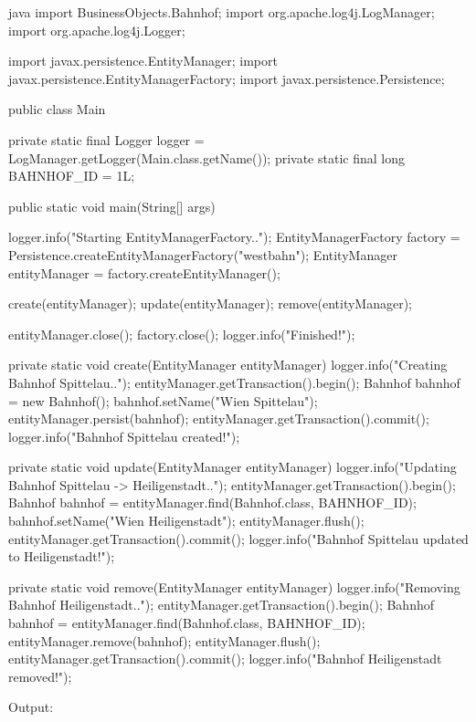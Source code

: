 \begin{code}{java}
import BusinessObjects.Bahnhof;
import org.apache.log4j.LogManager;
import org.apache.log4j.Logger;

import javax.persistence.EntityManager;
import javax.persistence.EntityManagerFactory;
import javax.persistence.Persistence;

public class Main {
    private static final Logger logger = LogManager.getLogger(Main.class.getName());
    private static final long BAHNHOF_ID = 1L;

    public static void main(String[] args) {
        logger.info("Starting EntityManagerFactory..");
        EntityManagerFactory factory = Persistence.createEntityManagerFactory("westbahn");
        EntityManager entityManager = factory.createEntityManager();

        create(entityManager);
        update(entityManager);
        remove(entityManager);

        entityManager.close();
        factory.close();
        logger.info("Finished!");
    }

    private static void create(EntityManager entityManager) {
        logger.info("Creating Bahnhof Spittelau..");
        entityManager.getTransaction().begin();
        Bahnhof bahnhof = new Bahnhof();
        bahnhof.setName("Wien Spittelau");
        entityManager.persist(bahnhof);
        entityManager.getTransaction().commit();
        logger.info("Bahnhof Spittelau created!");
    }

    private static void update(EntityManager entityManager) {
        logger.info("Updating Bahnhof Spittelau -> Heiligenstadt..");
        entityManager.getTransaction().begin();
        Bahnhof bahnhof = entityManager.find(Bahnhof.class, BAHNHOF_ID);
        bahnhof.setName("Wien Heiligenstadt");
        entityManager.flush();
        entityManager.getTransaction().commit();
        logger.info("Bahnhof Spittelau updated to Heiligenstadt!");
    }

    private static void remove(EntityManager entityManager) {
        logger.info("Removing Bahnhof Heiligenstadt..");
        entityManager.getTransaction().begin();
        Bahnhof bahnhof = entityManager.find(Bahnhof.class, BAHNHOF_ID);
        entityManager.remove(bahnhof);
        entityManager.flush();
        entityManager.getTransaction().commit();
        logger.info("Bahnhof Heiligenstadt removed!");
    }
}
\end{code}

Output:

